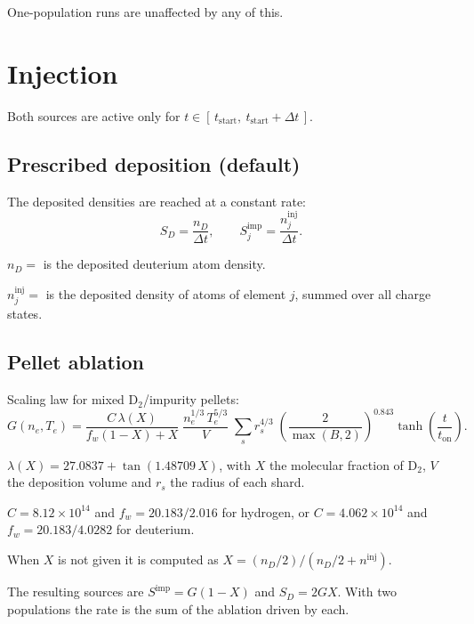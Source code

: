 \documentclass[11pt,a4paper]{article}
\begin{document}
One-population runs are unaffected by any of this.

\section{Injection}

Both sources are active only for
$t \in [\,t_{\mathrm{start}},\ t_{\mathrm{start}} + \Delta t\,]$.

\subsection*{Prescribed deposition (default)}

The deposited densities are reached at a constant rate:
\begin{equation}
  S_D = \frac{n_D}{\Delta t} ,
  \qquad
  S^{\mathrm{imp}}_j = \frac{n^{\mathrm{inj}}_j}{\Delta t} .
\end{equation}

$n_D = $  is the deposited deuterium atom density.

$n^{\mathrm{inj}}_j = $  is the deposited
density of atoms of element $j$, summed over all charge states.

\subsection*{Pellet ablation}

Scaling law for mixed $\mathrm{D_2}$/impurity pellets:
\begin{equation}
  G(n_e, T_e) = \frac{C\, \lambda(X)}{f_w (1-X) + X}\;
                \frac{n_e^{1/3}\, T_e^{5/3}}{V}\; \sum_s r_s^{4/3}
                \;\left(\frac{2}{\max(B,2)}\right)^{0.843}
                \tanh\!\left(\frac{t}{t_{\mathrm{on}}}\right) .
\end{equation}

$\lambda(X) = 27.0837 + \tan(1.48709\, X)$, with $X$ the molecular fraction of $\mathrm{D_2}$,
$V$ the deposition volume and $r_s$ the radius of each shard.

$C = 8.12 \times 10^{14}$ and $f_w = 20.183/2.016$ for hydrogen, or
$C = 4.062 \times 10^{14}$ and $f_w = 20.183/4.0282$ for deuterium.

When $X$ is not given it is computed as $X = (n_D/2)/(n_D/2 + n^{\mathrm{inj}})$.

The resulting sources are $S^{\mathrm{imp}} = G(1-X)$ and $S_D = 2 G X$. With two populations
the rate is the sum of the ablation driven by each.
\end{document}

